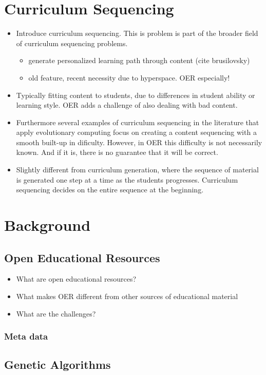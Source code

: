 

\section{Curriculum Sequencing}
\label{sec:task_curr_seq}
\begin{itemize}
	\item Introduce curriculum sequencing. This is problem is part of the
		broader field of curriculum sequencing problems.
		\begin{itemize}
			\item generate personalized learning path through content (cite
				brusilovsky)
			\item old feature, recent necessity due to hyperspace. OER
				especially!
		\end{itemize}
	\item Typically fitting content to students, due to differences in student
		ability or learning style. OER adds a challenge of also dealing with
		bad content.
	\item Furthermore several examples of curriculum sequencing in the
		literature that apply evolutionary computing focus on creating a
		content sequencing with a smooth built-up in dificulty. However, in OER
		this difficulty is not necessarily known. And if it is, there is no
		guarantee that it will be correct.
	\item Slightly different from curriculum generation, where the sequence of
		material is generated one step at a time as the students progresses.
		Curriculum sequencing decides on the entire sequence at the beginning.
\end{itemize}

\section{Background}
\subsection{Open Educational Resources}
\begin{itemize}
	\item What are open educational resources?
	\item What makes OER different from other sources of educational material
	\item What are the challenges?
\end{itemize}
\subsubsection{Meta data}

\subsection{Genetic Algorithms}
